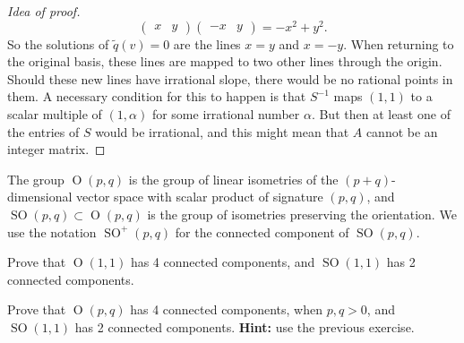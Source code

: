 \documentclass{article}
\numberwithin{equation}{section}
\renewcommand{\O}{\operatorname{O}}
\DeclareMathOperator{\SO}{SO}
\begin{document}
\begin{proof}[Idea of proof]
\[		\begin{pmatrix}
			x&y
		\end{pmatrix}
		\begin{pmatrix}
			-x&y
		\end{pmatrix}=-x^2+y^2.\]
		So the solutions of $\tilde q(v)=0$ are the lines $x=y$ and $x=-y$. When returning to the original basis, these lines are mapped to two other lines through the origin. Should these new lines have irrational slope, there would be no rational points in them. A necessary condition for this to happen is that $S^{-1}$ maps $(1,1)$ to a scalar multiple of $(1,\alpha)$ for some irrational number $\alpha$. But then at least one of the entries of $S$ would be irrational, and this {\color{magenta}might mean} that $A$ cannot be an integer matrix.
	\end{proof}
	\begin{defn}
		The group $\O(p,q)$ is the group of linear isometries of the $(p+q)$-dimensional vector space with scalar product of signature $(p,q)$, and $\SO(p,q)\subset\O(p,q)$ is the group of isometries preserving the orientation. We use the notation $\SO^+(p,q)$ for the connected component of $\SO(p,q)$.
	\end{defn}
	\begin{exercise}\label{ex:2.2}
		Prove that $\O(1,1)$ has 4 connected components, and $\SO(1,1)$ has 2 connected components.
	\end{exercise}
	\begin{exercise}\label{ex:2.3}
		Prove that $\O(p,q)$ has 4 connected components, when $p,q>0$, and $\SO(1,1)$ has 2 connected components. \textbf{Hint:} use the previous exercise.
	\end{exercise}
\end{document}
